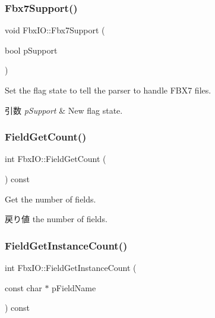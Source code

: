 \subsubsection{\texorpdfstring{Fbx7\+Support()}{Fbx7Support()}\hspace{0.1cm}{\footnotesize\ttfamily [2/2]}}
{\footnotesize\ttfamily void Fbx\+I\+O\+::\+Fbx7\+Support (\begin{DoxyParamCaption}\item[{bool}]{p\+Support }\end{DoxyParamCaption})}

Set the flag state to tell the parser to handle F\+B\+X7 files. 
\begin{DoxyParams}{引数}
{\em p\+Support} & New flag state. \\
\hline
\end{DoxyParams}
\mbox{\label{class_fbx_i_o_a03e5080780554283a6ffedb11b8c352a}} 
\subsubsection{\texorpdfstring{Field\+Get\+Count()}{FieldGetCount()}}
{\footnotesize\ttfamily int Fbx\+I\+O\+::\+Field\+Get\+Count (\begin{DoxyParamCaption}{ }\end{DoxyParamCaption}) const}

Get the number of fields. \begin{DoxyReturn}{戻り値}
the number of fields. 
\end{DoxyReturn}
\mbox{\label{class_fbx_i_o_ae9e361e4efad6e15289bf0eafa651866}} 
\subsubsection{\texorpdfstring{Field\+Get\+Instance\+Count()}{FieldGetInstanceCount()}}
{\footnotesize\ttfamily int Fbx\+I\+O\+::\+Field\+Get\+Instance\+Count (\begin{DoxyParamCaption}\item[{const char $\ast$}]{p\+Field\+Name }\end{DoxyParamCaption}) const}

